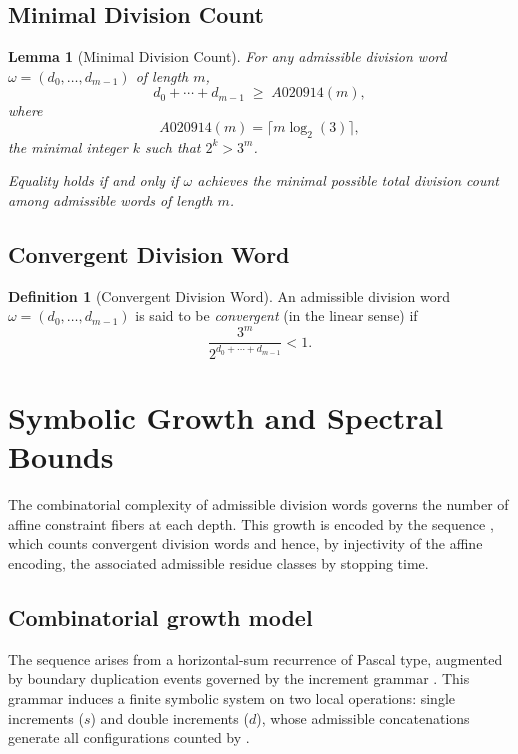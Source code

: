 \documentclass[12pt, oneside]{article}
\numberwithin{equation}{section}
\theoremstyle{definition}
\newtheorem{definition}{Definition}[section]
\theoremstyle{plain}
\newtheorem{lemma}[theorem]{Lemma}
\theoremstyle{remark}
\begin{document}
\subsection{Minimal Division Count}

\begin{lemma}[Minimal Division Count]
For any admissible division word $\omega=(d_0,\dots,d_{m-1})$ of length $m$,
\[
d_0 + \cdots + d_{m-1} \;\ge\; A020914(m),
\]
where
\[
A020914(m) = \lceil m \log_2(3) \rceil,
\]
the minimal integer $k$ such that $2^k > 3^m$.

Equality holds if and only if $\omega$ achieves the minimal possible total
division count among admissible words of length $m$.
\end{lemma}

\subsection{Convergent Division Word}

\begin{definition}[Convergent Division Word]
An admissible division word $\omega = (d_0,\dots,d_{m-1})$ is said to be
\emph{convergent} (in the linear sense) if
\[
\frac{3^m}{2^{d_0+\cdots+d_{m-1}}} < 1.
\]
\end{definition}

\section{Symbolic Growth and Spectral Bounds}
\label{sec:symbolic-growth}

The combinatorial complexity of admissible division words governs the number of
affine constraint fibers at each depth. This growth is encoded by the sequence
, which counts convergent division words and hence, by injectivity
of the affine encoding, the associated admissible residue classes by stopping time.

\subsection{Combinatorial growth model}

The sequence  arises from a horizontal-sum recurrence of Pascal type,
augmented by boundary duplication events governed by the increment grammar
. This grammar induces a finite symbolic system on two local operations:
single increments ($s$) and double increments ($d$), whose admissible
concatenations generate all configurations counted by .
\end{document}
